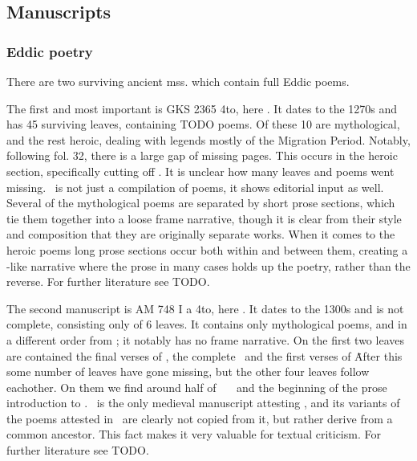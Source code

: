   \subsection{Manuscripts}

    \subsubsection{Eddic poetry}
    There are two surviving ancient mss. which contain full Eddic poems.

    The first and most important is GKS 2365 4to, here \Regius. It dates to the 1270s and has 45 surviving leaves, containing TODO poems. Of these 10 are mythological, and the rest heroic, dealing with legends mostly of the Migration Period. Notably, following fol. 32, there is a large gap of missing pages. This occurs in the heroic section, specifically cutting off \Sigrdrifumal. It is unclear how many leaves and poems went missing.
    \Regius\ is not just a compilation of poems, it shows editorial input as well. Several of the mythological poems are separated by short prose sections, which tie them together into a loose frame narrative, though it is clear from their style and composition that they are originally separate works. When it comes to the heroic poems long prose sections occur both within and between them, creating a -like narrative where the prose in many cases holds up the poetry, rather than the reverse. For further literature see TODO.

    The second manuscript is AM 748 I a 4to, here \AM. It dates to the 1300s and is not complete, consisting only of 6 leaves. It contains only mythological poems, and in a different order from \Regius; it notably has no frame narrative. On the first two leaves are contained the final verses of \Harbardsljod, the complete \Baldrsdraumar\, and the first verses of \Skirnismal\. After this some number of leaves have gone missing, but the other four leaves follow eachother. On them we find around half of \Vafthrudnismal\, \Grimnismal\, \Hymiskvida\ and the beginning of the prose introduction to \Volundarkvida. \AM\ is the only medieval manuscript attesting \Baldrsdraumar, and its variants of the poems attested in \Regius\ are clearly not copied from it, but rather derive from a common ancestor. This fact makes it very valuable for textual criticism. For further literature see TODO.

